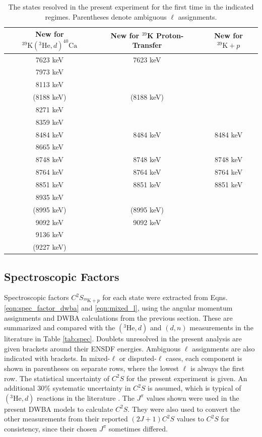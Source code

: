 \begin{table}[t]
\centering
\caption{\label{tab:new_states}The states resolved in the present experiment for the first time in the indicated regimes. Parentheses denote ambiguous $\ell$ assignments.}
\begin{tabular}{ccc}
\hline\midrule
New for $^{39}\mathrm{K}(^{3}\mathrm{He},d)^{40}\mathrm{Ca}$&New for $^{39}$K Proton-Transfer&New for $^{39}\mathrm{K}+p$\\ \midrule
7623 keV&7623 keV&\\
7973 keV&&\\
8113 keV&&\\
(8188 keV)&(8188 keV)&\\
8271 keV&&\\
8359 keV&&\\
8484 keV&8484 keV&8484 keV\\
8665 keV&&\\
8748 keV&8748 keV&8748 keV\\
8764 keV&8764 keV&8764 keV\\
8851 keV&8851 keV&8851 keV\\
8935 keV&&\\
(8995 keV)&(8995 keV)&\\
9092 keV&9092 keV&\\
9136 keV&&\\
(9227 keV)&&\\
\hline\hline
\end{tabular}
\end{table}

\subsection{Spectroscopic Factors} \label{subsec:DWBA_Spec}

Spectroscopic factors $C^{2}S_{^{39}\mathrm{K} + p}$ for each state were extracted from Eqns. \ref{eqn:spec_factor_dwba} and \ref{eqn:mixed_l}, using the angular momentum assignments and DWBA calculations from the previous section. These are summarized and compared with the $(^{3}\mathrm{He},d)$ \cite{Erskine1966,Seth1967,Forster1970,Cage1971} and $(d,n)$ \cite{Fuchs1969} measurements in the literature in Table \ref{tab:spec}. Doublets unresolved in the present analysis are given brackets around their ENSDF \cite{Chen2017} energies. Ambiguous $\ell$ assignments are also indicated with brackets. In mixed-$\ell$ or disputed-$\ell$ cases, each component is shown in parentheses on separate rows, where the lowest $\ell$ is always the first row. The statistical uncertainty of $C^{2}S$ for the present experiment is given. An additional $30\%$ systematic uncertainty in $C^{2}S$ is assumed, which is typical of $(^{3}\mathrm{He},d)$ reactions in the literature \cite{Endt1977}. The $J^{\pi}$ values shown were used in the present DWBA models to calculate $C^{2}S$. They were also used to convert the other measurements from their reported $(2J+1)C^{2}S$ values to $C^{2}S$ for consistency, since their chosen $J^{\pi}$ sometimes differed.


